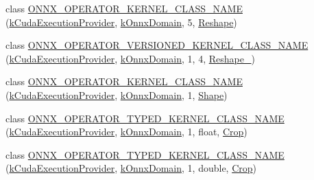\begin{DoxyCompactItemize}
\item 
class \mbox{\hyperlink{namespaceonnxruntime_1_1cuda_a0477687642bdd7e7b894441b845d082c}{O\+N\+N\+X\+\_\+\+O\+P\+E\+R\+A\+T\+O\+R\+\_\+\+K\+E\+R\+N\+E\+L\+\_\+\+C\+L\+A\+S\+S\+\_\+\+N\+A\+ME}} (\mbox{\hyperlink{namespaceonnxruntime_a73ebc64887ddd1968e3cef47ffefe35b}{k\+Cuda\+Execution\+Provider}}, \mbox{\hyperlink{namespaceonnxruntime_ac0e7c0c106a2c9e9594560a3ab289fa0}{k\+Onnx\+Domain}}, 5, \mbox{\hyperlink{classonnxruntime_1_1cuda_1_1Reshape}{Reshape}})
\item 
class \mbox{\hyperlink{namespaceonnxruntime_1_1cuda_acea0c2af524f34867e8daa9e232bcbd1}{O\+N\+N\+X\+\_\+\+O\+P\+E\+R\+A\+T\+O\+R\+\_\+\+V\+E\+R\+S\+I\+O\+N\+E\+D\+\_\+\+K\+E\+R\+N\+E\+L\+\_\+\+C\+L\+A\+S\+S\+\_\+\+N\+A\+ME}} (\mbox{\hyperlink{namespaceonnxruntime_a73ebc64887ddd1968e3cef47ffefe35b}{k\+Cuda\+Execution\+Provider}}, \mbox{\hyperlink{namespaceonnxruntime_ac0e7c0c106a2c9e9594560a3ab289fa0}{k\+Onnx\+Domain}}, 1, 4, \mbox{\hyperlink{classonnxruntime_1_1cuda_1_1Reshape__1}{Reshape\+\_}})
\item 
class \mbox{\hyperlink{namespaceonnxruntime_1_1cuda_adbec3590e210bfeb15b4e05e1ba611fc}{O\+N\+N\+X\+\_\+\+O\+P\+E\+R\+A\+T\+O\+R\+\_\+\+K\+E\+R\+N\+E\+L\+\_\+\+C\+L\+A\+S\+S\+\_\+\+N\+A\+ME}} (\mbox{\hyperlink{namespaceonnxruntime_a73ebc64887ddd1968e3cef47ffefe35b}{k\+Cuda\+Execution\+Provider}}, \mbox{\hyperlink{namespaceonnxruntime_ac0e7c0c106a2c9e9594560a3ab289fa0}{k\+Onnx\+Domain}}, 1, \mbox{\hyperlink{classonnxruntime_1_1Shape}{Shape}})
\item 
class \mbox{\hyperlink{namespaceonnxruntime_1_1cuda_a5430c063c290683da5b0443f3e402553}{O\+N\+N\+X\+\_\+\+O\+P\+E\+R\+A\+T\+O\+R\+\_\+\+T\+Y\+P\+E\+D\+\_\+\+K\+E\+R\+N\+E\+L\+\_\+\+C\+L\+A\+S\+S\+\_\+\+N\+A\+ME}} (\mbox{\hyperlink{namespaceonnxruntime_a73ebc64887ddd1968e3cef47ffefe35b}{k\+Cuda\+Execution\+Provider}}, \mbox{\hyperlink{namespaceonnxruntime_ac0e7c0c106a2c9e9594560a3ab289fa0}{k\+Onnx\+Domain}}, 1, float, \mbox{\hyperlink{classonnxruntime_1_1cuda_1_1Crop}{Crop}})
\item 
class \mbox{\hyperlink{namespaceonnxruntime_1_1cuda_ad0378024d41121e444644471a2edd06e}{O\+N\+N\+X\+\_\+\+O\+P\+E\+R\+A\+T\+O\+R\+\_\+\+T\+Y\+P\+E\+D\+\_\+\+K\+E\+R\+N\+E\+L\+\_\+\+C\+L\+A\+S\+S\+\_\+\+N\+A\+ME}} (\mbox{\hyperlink{namespaceonnxruntime_a73ebc64887ddd1968e3cef47ffefe35b}{k\+Cuda\+Execution\+Provider}}, \mbox{\hyperlink{namespaceonnxruntime_ac0e7c0c106a2c9e9594560a3ab289fa0}{k\+Onnx\+Domain}}, 1, double, \mbox{\hyperlink{classonnxruntime_1_1cuda_1_1Crop}{Crop}})
\item 

\end{DoxyCompactItemize}
